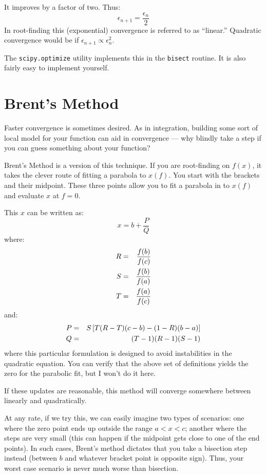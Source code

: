 
\begin{answer}
  It improves by a factor of two. Thus:
  \begin{equation}
    \epsilon_{n+1} = \frac{\epsilon_n}{2}
  \end{equation}
  In root-finding this (exponential) convergence is referred to as
  ``linear.'' Quadratic convergence would be if $\epsilon_{n+1}\propto
  \epsilon_n^2$.
\end{answer}

The {\tt scipy.optimize} utility implements this in the {\tt bisect}
routine. It is also fairly easy to implement yourself.

\section{Brent's Method}

Faster convergence is sometimes desired. As in integration, building
some sort of local model for your function can aid in convergence ---
why blindly take a step if you can guess something about your
function? 

Brent's Method is a version of this technique. If you are root-finding
on $f(x)$, it takes the clever route of fitting a parabola to
$x(f)$. You start with the brackets and their midpoint.  These three
points allow you to fit a parabola in to $x(f)$ and evaluate $x$ at
$f=0$. 

This $x$ can be written as:
\begin{equation}
x = b + \frac{P}{Q}
\end{equation}
where:
\begin{eqnarray}
R &=& \frac{f(b)}{f(c)} \cr
S &=& \frac{f(b)}{f(a)} \cr
T &=& \frac{f(a)}{f(c)}
\end{eqnarray}
and:
\begin{eqnarray}
P &=& S\left[T(R-T)(c-b) - (1-R)(b-a)\right] \cr
Q &=& (T-1)(R-1)(S-1)
\end{eqnarray}
where this particular formulation is designed to avoid instabilities
in the quadratic equation. You can verify that the above set of
definitions yields the zero for the parabolic fit, but I won't do it
here.

If these updates are reasonable, this method will converge somewhere
between linearly and quadratically.

At any rate, if we try this, we can easily imagine two types of
scenarios: one where the zero point ends up outside the range $a<x<c$;
another where the steps are very small (this can happen if the
midpoint gets close to one of the end points). In such cases, Brent's
method dictates that you take a bisection step instead (between $b$
and whatever bracket point is opposite sign). Thus, your worst case
scenario is never much worse than bisection.

